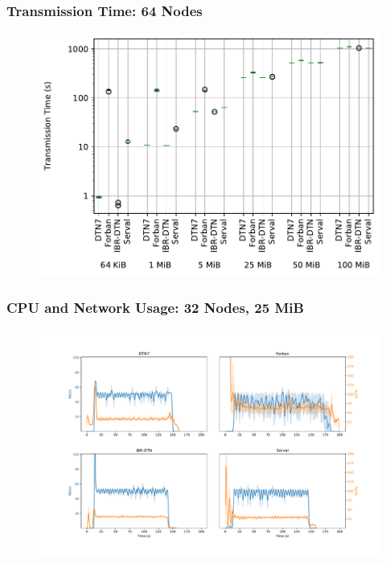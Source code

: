 \begin{frame}
  \frametitle{Transmission Time: 64 Nodes}

  \begin{figure}
    \includegraphics[width=0.8\linewidth,keepaspectratio]{include/chain-runtimes-64}
  \end{figure}
\end{frame}

\begin{frame}
  \frametitle{CPU and Network Usage: 32 Nodes, 25 MiB}

  \begin{figure}
    \includegraphics[width=0.9\linewidth,keepaspectratio]{include/cpu-load}
  \end{figure}
\end{frame}

